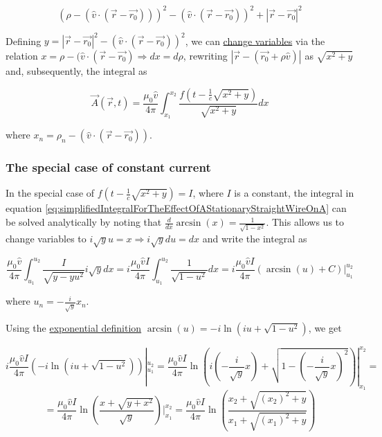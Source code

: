 ﻿\documentclass{article}
\begin{document}
\begin{equation*}
    (\rho - (\hat{v} \cdot (\vec{r} - \vec{r_0})))^2 - (\hat{v} \cdot (\vec{r} - \vec{r_0}))^2 + |\vec{r} - \vec{r_0}|^2
\end{equation*}

Defining $y = |\vec{r} - \vec{r_0}|^2 - (\hat{v} \cdot (\vec{r} - \vec{r_0}))^2$, we can \href{https://en.wikipedia.org/wiki/Change_of_variables}{change variables} via the relation $x = \rho - (\hat{v} \cdot (\vec{r} - \vec{r_0}) \Rightarrow dx = d \rho$, rewriting $|\vec{r} - (\vec{r_0} + \rho \hat{v})|$ as $\sqrt{x^2 + y}$ and, subsequently, the integral as

\begin{equation}
    \label{eq:simplifiedIntegralForTheEffectOfAStationaryStraightWireOnA}
    \vec{A}(\vec{r}, t) = \frac{\mu_0 \hat{v}}{4 \pi} \int_{x_1}^{x_2} \frac{f(t - \frac{1}{c} \sqrt{x^2 + y})}{\sqrt{x^2 + y}} dx
\end{equation}

where $x_n = \rho_n - (\hat{v} \cdot (\vec{r} - \vec{r_0}))$.

\subsubsection{The special case of constant current}

In the special case of $f(t - \frac{1}{c} \sqrt{x^2 + y}) = I$, where $I$ is a constant, the integral in equation \ref{eq:simplifiedIntegralForTheEffectOfAStationaryStraightWireOnA} can be solved analytically by noting that $\frac{d}{dx} \arcsin(x) = \frac{1}{\sqrt{1-x^2}}$. This allows us to change variables to $i \sqrt{y} u = x \Rightarrow i \sqrt{y} du = dx$ and write the integral as

\begin{equation*}
    \frac{\mu_0 \hat{v}}{4 \pi} \int_{u_1}^{u_2} \frac{I}{\sqrt{y - y u^2}} i \sqrt{y} dx = i \frac{\mu_0 \hat{v} I}{4 \pi} \int_{u_1}^{u_2} \frac{1}{\sqrt{1 - u^2}} dx = i \frac{\mu_0 \hat{v} I}{4 \pi} (\arcsin(u) + C) |_{u_1}^{u_2}
\end{equation*}

where $u_n = - \frac{i}{\sqrt{y}} x_n$.

Using the \href{https://en.wikipedia.org/wiki/List_of_trigonometric_identities#Exponential_definitions}{exponential definition} $\arcsin(u) = -i\ln(iu + \sqrt{1 - u^2})$, we get

\begin{equation*}
    i \frac{\mu_0 \hat{v} I}{4 \pi} (-i\ln(iu + \sqrt{1 - u^2})) |_{u_1}^{u_2} = \frac{\mu_0 \hat{v} I}{4 \pi} \ln \left( i(- \frac{i}{\sqrt{y}} x) + \sqrt{1 - (- \frac{i}{\sqrt{y}} x)^2} \right) |_{x_1}^{x_2} =
\end{equation*}
\begin{equation*}
    = \frac{\mu_0 \hat{v} I}{4 \pi} \ln \left( \frac{x + \sqrt{y + x^2}}{\sqrt{y}} \right) |_{x_1}^{x_2} = \frac{\mu_0 \hat{v} I}{4 \pi} \ln \left( \frac{x_2 + \sqrt{(x_2)^2 + y}}{x_1 + \sqrt{(x_1)^2 + y}} \right)
\end{equation*}
\end{document}
